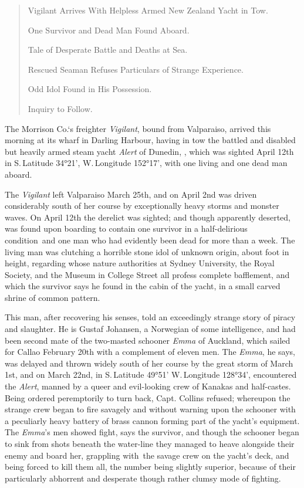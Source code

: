 \begin{quote}

Vigilant Arrives With Helpless Armed New Zealand Yacht in Tow.

One Survivor and Dead Man Found Aboard.

Tale of Desperate Battle and Deaths at Sea.

Rescued Seaman Refuses Particulars of Strange Experience.

Odd Idol Found in His Possession.

Inquiry to Follow.
\end{quote}


The Morrison Co.`s freighter \emph{Vigilant}, bound from Valparaiso, arrived
this morning at its wharf in Darling Harbour, having in tow the battled
and disabled but heavily armed steam yacht \emph{Alert} of Dunedin, , which
was sighted April 12th in S.\,Latitude 34°21', W.\,Longitude 152°17', with
one living and one dead man aboard.

The \emph{Vigilant} left Valparaiso March 25th, and on April 2nd was driven
considerably south of her course by exceptionally heavy storms and
monster waves. On April 12th the derelict was sighted; and though
apparently deserted, was found upon boarding to contain one survivor in
a half-delirious condition\est\ and one man who had evidently been dead for
more than a week. The living man was clutching a horrible stone idol of
unknown origin, about foot in height, regarding whose nature authorities
at Sydney University, the Royal Society, and the Museum in College
Street all profess complete bafflement, and which the survivor says he
found in the cabin of the yacht, in a small carved shrine of common
pattern.

This man, after recovering his senses, told an exceedingly strange story
of piracy and slaughter. He is Gustaf Johansen, a Norwegian of some
intelligence, and had been second mate of the two-masted schooner \emph{Emma}
of Auckland, which sailed for Callao February 20th with a complement of
eleven men. The \emph{Emma}, he says, was delayed and thrown widely south of
her course by the great storm of March 1st, and on March 22nd, in S.\,Latitude 49°51' W.\,Longitude 128°34', encountered the \emph{Alert}, manned by a
queer and evil-looking crew of Kanakas and half-castes. Being ordered
peremptorily to turn back, Capt. Collins refused; whereupon the strange
crew began to fire savagely and without warning upon the schooner with a
peculiarly heavy battery of brass cannon forming part of the yacht's
equipment. The \emph{Emma}'s men showed fight, says the survivor, and though
the schooner began to sink from shots beneath the water-line they
managed to heave alongside their enemy and board her, grappling with\est\ the
 savage crew on the yacht's deck, and being forced to kill them all, the
number being slightly superior, because of their particularly abhorrent
and desperate though rather clumsy mode of fighting.

